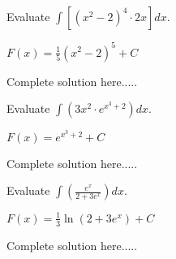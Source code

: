 \newpage
\begin{example}
Evaluate $\displaystyle\int \left[(x^2-2)^4\cdot 2x\right] dx$.
    \begin{sol}
    $F(x)=\displaystyle\frac{1}{5}(x^2-2)^5+C$
    \end{sol}
    \begin{solL}
    Complete solution here.....
    
    \end{solL}
    
\end{example}
\begin{example}
Evaluate $\displaystyle\int \left(3x^2\cdot e^{x^3+2}\right) dx$.
    \begin{sol}
    $F(x)=e^{x^3+2}+C$
    \end{sol}
    \begin{solL}
    Complete solution here.....
    
    \end{solL}
    
\end{example}
\begin{example}
Evaluate $\displaystyle\int \left(\frac{e^x}{2+3e^x}\right) dx$.
    \begin{sol}
    $F(x)=\displaystyle\frac{1}{3}\ln(2+3e^x)+C$
    \end{sol}
    \begin{solL}
    Complete solution here.....
    
    \end{solL}
    
\end{example}

